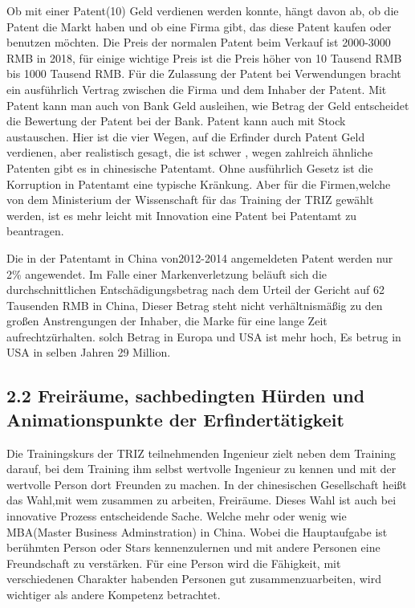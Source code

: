\documentclass[11pt,a4paper]{article}
\begin{document}
Ob mit einer Patent(10) Geld verdienen werden konnte, hängt davon ab, ob die
Patent die Markt haben und ob eine Firma gibt, das diese Patent kaufen oder
benutzen möchten. Die Preis der normalen Patent beim Verkauf ist 2000-3000 RMB
in 2018, für einige wichtige Preis ist die Preis höher von 10 Tausend RMB bis
1000 Tausend RMB. Für die Zulassung der Patent bei Verwendungen bracht ein
ausführlich Vertrag zwischen die Firma und dem Inhaber der Patent. Mit Patent
kann man auch von Bank Geld ausleihen, wie Betrag der Geld entscheidet die
Bewertung der Patent bei der Bank. Patent kann auch mit Stock
austauschen. Hier ist die vier Wegen, auf die Erfinder durch Patent Geld
verdienen, aber realistisch gesagt, die ist schwer , wegen zahlreich ähnliche
Patenten gibt es in chinesische Patentamt. Ohne ausführlich Gesetz ist die
Korruption in Patentamt eine typische Kränkung. Aber für die Firmen,welche von
dem Ministerium der Wissenschaft für das Training der TRIZ gewählt werden,
ist es mehr leicht mit Innovation eine Patent bei Patentamt zu beantragen.

Die in der Patentamt in China von2012-2014 angemeldeten Patent werden nur 2\%
angewendet. Im Falle einer Markenverletzung beläuft sich die
durchschnittlichen Entschädigungsbetrag nach dem Urteil der Gericht auf 62
Tausenden RMB in China, Dieser Betrag steht nicht verhältnismäßig zu den
großen Anstrengungen der Inhaber, die Marke für eine lange Zeit
aufrechtzürhalten. solch Betrag in Europa und USA ist mehr hoch, Es betrug in
USA in selben Jahren 29 Million.

\subsection{2.2 Freiräume, sachbedingten Hürden und Animationspunkte der
  Erfindertätigkeit} 

Die Trainingskurs der TRIZ teilnehmenden Ingenieur zielt neben dem Training
darauf, bei dem Training ihm selbst wertvolle Ingenieur zu kennen und mit der
wertvolle Person dort Freunden zu machen. In der chinesischen Gesellschaft
heißt das Wahl,mit wem zusammen zu arbeiten, Freiräume. Dieses Wahl ist auch
bei innovative Prozess entscheidende Sache. Welche mehr oder wenig wie
MBA(Master Business Adminstration) in China. Wobei die Hauptaufgabe ist
berühmten Person oder Stars kennenzulernen und mit andere Personen eine
Freundschaft zu verstärken. Für eine Person wird die Fähigkeit, mit
verschiedenen Charakter habenden Personen gut zusammenzuarbeiten, wird
wichtiger als andere Kompetenz betrachtet.
\end{document}

